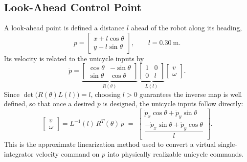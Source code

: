 \documentclass[conference]{IEEEtran}
\begin{document}
\subsection{Look-Ahead Control Point}
A look-ahead point is defined a distance $l$ ahead of the robot along its heading,
\begin{equation}
p = \begin{bmatrix} x + l\cos\theta \\ y + l\sin\theta \end{bmatrix}, \qquad l = 0.30~\text{m}.
\label{eq:lookahead}
\end{equation}
Its velocity is related to the unicycle inputs by
\begin{equation}
\dot p = \underbrace{\begin{bmatrix}\cos\theta & -\sin\theta\\ \sin\theta & \cos\theta\end{bmatrix}}_{R(\theta)}
\underbrace{\begin{bmatrix}1 & 0\\ 0 & l\end{bmatrix}}_{L(l)}
\begin{bmatrix}v\\ \omega\end{bmatrix}.
\label{eq:fwdkin}
\end{equation}
Since $\det\big(R(\theta)L(l)\big) = l$, choosing $l>0$ guarantees the inverse map is well defined, so that once a desired $\dot p$ is designed, the unicycle inputs follow directly:
\begin{equation}
\begin{bmatrix}v\\ \omega\end{bmatrix} = L^{-1}(l)\,R^{T}(\theta)\,\dot p
\;=\;
\begin{bmatrix} \dot p_x\cos\theta + \dot p_y\sin\theta \\[2pt] \dfrac{-\dot p_x\sin\theta + \dot p_y\cos\theta}{l} \end{bmatrix}.
\label{eq:invkin}
\end{equation}
This is the approximate linearization method used to convert a virtual single-integrator velocity command on $p$ into physically realizable unicycle commands.
\end{document}
